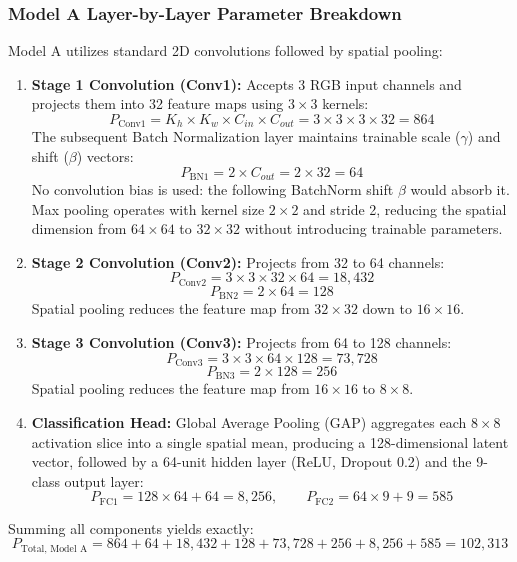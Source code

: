 \documentclass[11pt,a4paper]{article}
\begin{document}
\subsubsection{Model A Layer-by-Layer Parameter Breakdown}
Model A utilizes standard 2D convolutions followed by spatial pooling:
\begin{enumerate}[leftmargin=*,itemsep=2pt]
  \item \textbf{Stage 1 Convolution (Conv1):} Accepts 3 RGB input channels and projects them into 32 feature maps using $3 \times 3$ kernels:
  \begin{equation}
    P_{\text{Conv1}} = K_h \times K_w \times C_{in} \times C_{out} = 3 \times 3 \times 3 \times 32 = 864
  \end{equation}
  The subsequent Batch Normalization layer maintains trainable scale ($\gamma$) and shift ($\beta$) vectors:
  \begin{equation}
    P_{\text{BN1}} = 2 \times C_{out} = 2 \times 32 = 64
  \end{equation}
  No convolution bias is used: the following BatchNorm shift $\beta$ would absorb it. Max pooling operates with kernel size $2 \times 2$ and stride 2, reducing the spatial dimension from $64 \times 64$ to $32 \times 32$ without introducing trainable parameters.
  
  \item \textbf{Stage 2 Convolution (Conv2):} Projects from 32 to 64 channels:
  \begin{equation}
    P_{\text{Conv2}} = 3 \times 3 \times 32 \times 64 = 18,432
  \end{equation}
  \begin{equation}
    P_{\text{BN2}} = 2 \times 64 = 128
  \end{equation}
  Spatial pooling reduces the feature map from $32 \times 32$ down to $16 \times 16$.
  
  \item \textbf{Stage 3 Convolution (Conv3):} Projects from 64 to 128 channels:
  \begin{equation}
    P_{\text{Conv3}} = 3 \times 3 \times 64 \times 128 = 73,728
  \end{equation}
  \begin{equation}
    P_{\text{BN3}} = 2 \times 128 = 256
  \end{equation}
  Spatial pooling reduces the feature map from $16 \times 16$ to $8 \times 8$.
  
  \item \textbf{Classification Head:} Global Average Pooling (GAP) aggregates each $8 \times 8$ activation slice into a single spatial mean, producing a 128-dimensional latent vector, followed by a 64-unit hidden layer (ReLU, Dropout 0.2) and the 9-class output layer:
  \begin{equation}
    P_{\text{FC1}} = 128 \times 64 + 64 = 8,256, \qquad P_{\text{FC2}} = 64 \times 9 + 9 = 585
  \end{equation}
\end{enumerate}
Summing all components yields exactly:
\begin{equation}
  P_{\text{Total, Model A}} = 864 + 64 + 18,432 + 128 + 73,728 + 256 + 8,256 + 585 = 102,313
\end{equation}
\end{document}
